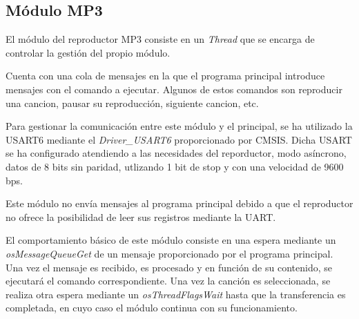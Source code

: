 \subsection{Módulo MP3}
El módulo del reproductor MP3 consiste en un \textit{Thread} que se encarga de controlar la gestión del propio módulo.

Cuenta con una cola de mensajes en la que el programa principal introduce mensajes con el comando a ejecutar. Algunos de estos comandos son reproducir una cancion, pausar su reproducción, siguiente cancion, etc.

Para gestionar la comunicación entre este módulo y el principal, se ha utilizado la USART6 mediante el \textit{Driver\_USART6} proporcionado por CMSIS. Dicha USART se ha configurado atendiendo a las necesidades del reporductor, modo asíncrono, datos de 8 bits sin paridad, utlizando 1 bit de stop y con una velocidad de 9600 bps.

Este módulo no envía mensajes al programa principal debido a que el reproductor no ofrece la posibilidad de leer sus registros mediante la UART.

El comportamiento básico de este módulo consiste en una espera mediante un \textit{osMessageQueueGet} de un mensaje proporcionado por el programa principal. Una vez el mensaje es recibido, es procesado y en función de su contenido, se ejecutará el comando correspondiente. Una vez la canción es seleccionada, se realiza otra espera mediante un \textit{osThreadFlagsWait} hasta que la transferencia es completada, en cuyo caso el módulo continua con su funcionamiento.